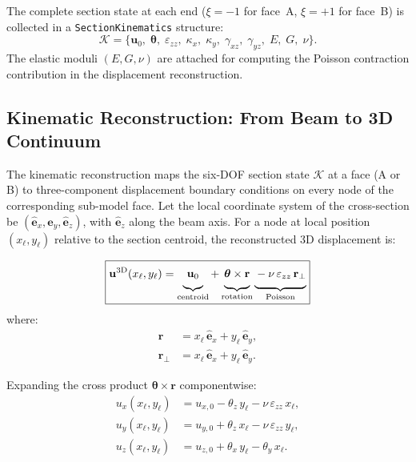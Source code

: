 The complete section state at each end ($\xi = -1$ for face~A,
$\xi = +1$ for face~B) is collected in a \texttt{SectionKinematics}
structure:
\begin{equation}
  \mathcal{K}
  = \bigl\{
      \mathbf{u}_0,\;\boldsymbol{\theta},\;
      \varepsilon_{zz},\;
      \kappa_x,\;\kappa_y,\;
      \gamma_{xz},\;\gamma_{yz},\;
      E,\;G,\;\nu
    \bigr\}.
  \label{eq:nlevo-section-kin}
\end{equation}
The elastic moduli $(E, G, \nu)$ are attached for computing the
Poisson contraction contribution in the displacement reconstruction.


\subsection{Kinematic Reconstruction: From Beam to 3D Continuum}
\label{ssec:nlevo-reconstruction}

The kinematic reconstruction maps the six-DOF section state
$\mathcal{K}$ at a face (A or B) to three-component displacement
boundary conditions on every node of the corresponding sub-model face.
Let the local coordinate system of the cross-section be
$(\hat{\mathbf{e}}_x, \hat{\mathbf{e}}_y, \hat{\mathbf{e}}_z)$, with
$\hat{\mathbf{e}}_z$ along the beam axis.  For a node at local
position $(x_\ell, y_\ell)$ relative to the section centroid, the
reconstructed 3D displacement is:

\begin{equation}
  \boxed{
  \mathbf{u}^{\mathrm{3D}}(x_\ell, y_\ell)
  = \underbrace{\mathbf{u}_0\vphantom{\Big|}}_{\text{centroid}}
  + \underbrace{\boldsymbol{\theta}
    \times \mathbf{r}\vphantom{\Big|}}_{\text{rotation}}
  \underbrace{{} - \nu\,\varepsilon_{zz}\,
    \mathbf{r}_\perp\vphantom{\Big|}}_{\text{Poisson}}
  }
  \label{eq:nlevo-recon}
\end{equation}
where:
\begin{align}
  \mathbf{r} &= x_\ell\,\hat{\mathbf{e}}_x
               + y_\ell\,\hat{\mathbf{e}}_y,
  \\
  \mathbf{r}_\perp &= x_\ell\,\hat{\mathbf{e}}_x
                     + y_\ell\,\hat{\mathbf{e}}_y.
\end{align}

Expanding the cross product
$\boldsymbol{\theta} \times \mathbf{r}$ componentwise:
\begin{align}
  u_x(x_\ell, y_\ell)
    &= u_{x,0} - \theta_z\,y_\ell - \nu\,\varepsilon_{zz}\,x_\ell,
  \label{eq:nlevo-ux}
  \\
  u_y(x_\ell, y_\ell)
    &= u_{y,0} + \theta_z\,x_\ell - \nu\,\varepsilon_{zz}\,y_\ell,
  \label{eq:nlevo-uy}
  \\
  u_z(x_\ell, y_\ell)
    &= u_{z,0} + \theta_x\,y_\ell - \theta_y\,x_\ell.
  \label{eq:nlevo-uz}
\end{align}


